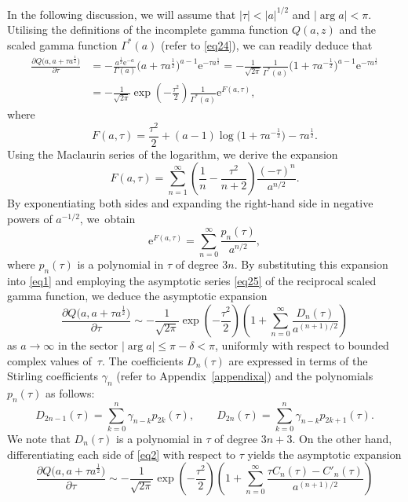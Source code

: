 \documentclass[11pt]{article}
\numberwithin{equation}{section}
\def\e{\mathrm{e}}
\numberwithin{equation}{section}
\begin{document}
In the following discussion, we will assume that $|\tau| < |a|^{1/2}$ and $|\arg a| < \pi$. Utilising the definitions of the incomplete gamma function $Q(a,z)$ and the scaled gamma function $\Gamma^\ast (a)$ (refer to \eqref{eq24}), we can readily deduce that
\begin{align}
\frac{\partial Q\big(a,a + \tau a^{\frac{1}{2}}\big)}{\partial \tau} & = - \frac{a^{\frac{1}{2}} \e^{ - a}}{\Gamma (a)}\big( a + \tau a^{\frac{1}{2}} \big)^{a - 1} \e^{ - \tau a^{\frac{1}{2}} } = - \frac{1}{\sqrt{2\pi }}\frac{1}{\Gamma^\ast (a)}\big( 1 + \tau a^{ - \frac{1}{2}}\big)^{a - 1} \e^{ - \tau a^{\frac{1}{2}} }\nonumber \\ & = - \frac{1}{\sqrt {2\pi }}\exp\left( - \frac{\tau^2}{2} \right)\frac{1}{\Gamma^\ast (a)}\e^{F(a,\tau )} ,\label{eq1}
\end{align}
where
\[
F(a,\tau ) = \frac{\tau ^2}{2} + (a - 1)\log \big(1 + \tau a^{-\frac{1}{2}}\big) - \tau a^{\frac{1}{2}} .
\]
Using the Maclaurin series of the logarithm, we derive the expansion
\[
F(a,\tau ) = \sum_{n = 1}^\infty \left( \frac{1}{n}-\frac{\tau^2}{n + 2}\right)\frac{( - \tau )^n}{a^{n/2}} .
\]
By exponentiating both sides and expanding the right-hand side in negative powers of $a^{-1/2}$, we~obtain
\[
\e^{F(a,\tau )} = \sum_{n = 0}^\infty \frac{p_n (\tau )}{a^{n/2} },
\]
where $p_n(\tau)$ is a polynomial in $\tau$ of degree $3n$. By substituting this expansion into \eqref{eq1} and employing the asymptotic series \eqref{eq25} of the reciprocal scaled gamma function, we deduce the asymptotic expansion
\[
\frac{\partial Q\big(a,a + \tau a^{\frac{1}{2}}\big)}{\partial \tau} \sim - \frac{1}{\sqrt{2\pi}}\exp \left(- \frac{\tau^2}{2}\right)\left( 1 + \sum_{n = 0}^\infty \frac{D_n (\tau )}{a^{(n + 1)/2}} \right)
\]
as $a\to \infty$ in the sector $|\arg a| \le \pi-\delta<\pi$, uniformly with respect to bounded complex values of~$\tau$. The coefficients $D_n(\tau)$ are expressed in terms of the Stirling coefficients $\gamma_n$ (refer to Appendix~\ref{appendixa}) and the polynomials $p_n(\tau)$ as follows:
\begin{equation}\label{eq4}
D_{2n - 1} (\tau ) = \sum_{k = 0}^n \gamma _{n - k} p_{2k} (\tau ) ,\qquad D_{2n} (\tau ) = \sum_{k = 0}^n \gamma _{n - k} p_{2k + 1} (\tau ).
\end{equation}
We note that $D_n(\tau)$ is a polynomial in $\tau$ of degree $3n+3$. On the other hand, differentiating each side of \eqref{eq2} with respect to $\tau$ yields the asymptotic expansion
\[
\frac{\partial Q\big(a,a + \tau a^{\frac{1}{2}}\big)}{\partial \tau} \sim - \frac{1}{\sqrt {2\pi }}\exp \left( - \frac{\tau^2}{2}\right)\left( 1 + \sum_{n = 0}^\infty \frac{\tau C_n (\tau ) - C'_n (\tau )}{a^{(n + 1)/2}} \right)
\]
\end{document}
